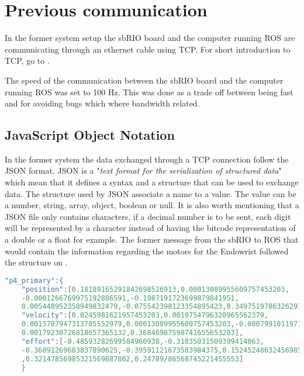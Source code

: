 

 \section{Previous communication}\label{sec:prev_communication}
In the former system setup the sbRIO board and the computer running ROS are communicating through an ethernet cable using TCP. For short introduction to TCP, go to .

The speed of the communication between the sbRIO board and the computer running ROS was set to 100 Hz. This was done as a trade off between being fast and for avoiding bugs which where bandwidth related\cite{Chris_Surgical}.

\subsection{JavaScript Object Notation}\label{subsec:JSON}
In the former system the data exchanged through a TCP connection follow the \gls{JSON} format. \gls{JSON} is a "\textit{text format for the serialization of structured data}"\cite{JSON_IETF} which mean that it defines a syntax and a structure that can be used to exchange data. The structure used by \gls{JSON} associate a name to a value. The value can be a number, string, array, object, boolean or null. It is also worth mentioning that a \gls{JSON} file only contains characters, if a decimal number is to be sent, each digit will be represented by a character instead of having the bitcode representation of a double or a float for example. The former message from the sbRIO to ROS that would contain the information regarding the motors for the Endowrist followed the structure on .

\begin{lstlisting}[caption={Example of the previous \gls{JSON} string.},label={JSON_lst},language=C]
"p4_primary":{
	"position":[0.18189165291842698526913,0.00013089955609757453203,
	-0.0001266769975192886591,-0.1987191723699879841951,
	0.005448952358949832479,-0.075542398123354895423,0.34975197863262971333179],
	"velocity":[0.0245981621957453203,0.0019754796320965562379,
	0.0015707947313785552979,0.00013089955609757453203,-0.08079910119712697,
	0.00179230726818657365132,0.36846987598741655653203],
	"effort":[-0.48593282699584960938,-0.31835031509399414063,
	-0.36891269683837890625,-0.39591121673583984375,0.15245248632456985325663
	,0.32147856985321569887862,0.24789/86568745221455553]
	}

\end{lstlisting}

